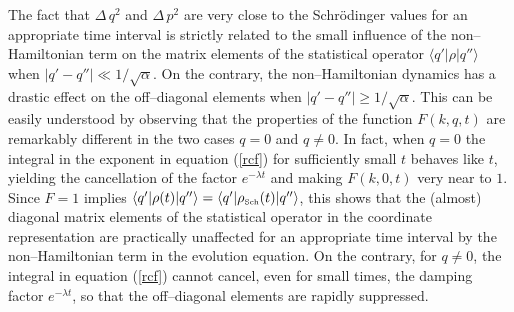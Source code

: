 \documentclass[12pt]{article}
\begin{document}
The fact that $\Delta \, q^{2}$ and $\Delta \, p^{2}$ are very
close to the Schr\"odinger values for an appropriate time interval
is strictly related to the small influence of the non--Hamiltonian
term on the matrix elements of the statistical operator $\langle
q'|\rho| q''\rangle$ when $| q' - q'' | \ll  1/\sqrt{\alpha}$. On
the contrary, the non--Hamiltonian dynamics has a drastic effect
on the off--diagonal elements when $| q' - q'' | \geq
1/\sqrt{\alpha}$. This can be easily understood by observing that
the properties of the function $F(k,q,t)$ are remarkably different
in the two cases $q=0$ and $q \neq 0$. In fact, when $q=0$ the
integral in the exponent in equation (\ref{rcf}) for sufficiently
small $t$ behaves like $t$, yielding the cancellation of the
factor $e^{-\lambda t}$ and making $F(k,0,t)$ very near to $1$.
Since $F=1$ implies $\langle q'|\rho(t)|q''\rangle = \langle
q'|\rho_{\makebox{\tiny Sch}}(t)|q''\rangle$, this shows that the
(almost) diagonal matrix elements of the statistical operator in
the coordinate representation are practically unaffected for an
appropriate time interval  by the non--Hamiltonian term in the
evolution equation. On the contrary, for $q\neq 0$, the integral
in equation (\ref{rcf}) cannot cancel, even for small times, the
damping factor $e^{-\lambda t}$, so that the off--diagonal
elements are rapidly suppressed.
\end{document}

